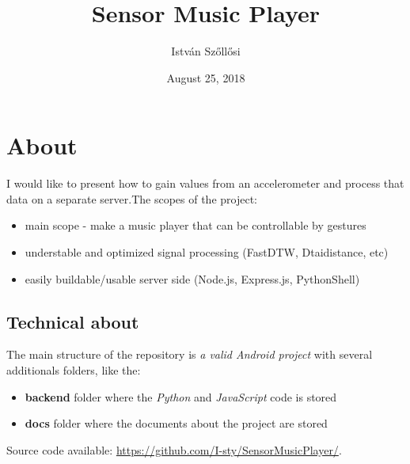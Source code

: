 \documentclass[12pt, a4paper, portrait]{article}
\title{\textbf{Sensor Music Player}}
\author{István Szőllősi}
\affil{Faculty of Sciences and Letters, ``Petru Maior'' University of Târgu Mureș}
\date{August 25, 2018}
\begin{document}
\maketitle
\newpage

\tableofcontents
\newpage

\section{About}
I would like to present how to gain values from an accelerometer and process that data on a separate server.\newline The scopes of the project:
\begin{itemize}
\item{main scope - make a music player that can be controllable by gestures}
\item{understable and optimized signal processing (FastDTW, Dtaidistance, etc)}
\item{easily buildable/usable server side (Node.js, Express.js, PythonShell)}
\end{itemize}
\subsection{Technical about}
\par The main structure of the repository is
\textit{a valid Android project} with several additionals folders, like the:
\begin{itemize}
\item{\textbf{backend}} folder where the \textit{Python} and \textit{JavaScript} code is stored
\item{\textbf{docs}} folder where the documents about the project are stored
\end{itemize}
\par Source code available: \url{https://github.com/I-sty/SensorMusicPlayer/}.
\end{document}
